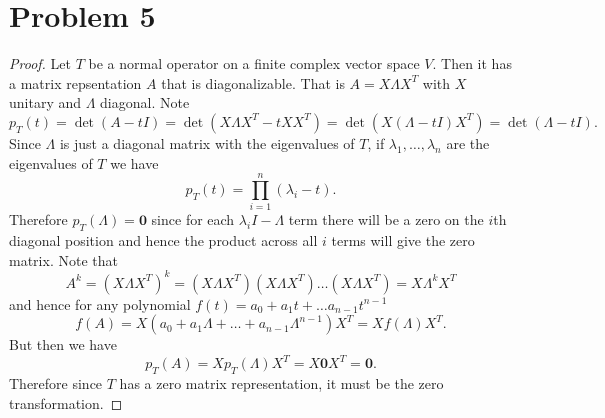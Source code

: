 \documentclass{article}
\begin{document}
\section*{Problem 5}
\begin{proof}
    Let $T$ be a normal operator on a finite complex vector space $V$. Then it has a matrix repsentation $A$ that is diagonalizable. That is $A = X \Lambda X^T$ with $X$ unitary and $\Lambda$ diagonal. Note
    \[
        p_{T}(t) = \det(A - tI) = \det(X \Lambda X^T - t XX^T ) = \det(X (\Lambda - tI) X^T) = \det(\Lambda - tI)
    .\]
    Since $\Lambda$ is just a diagonal matrix with the eigenvalues of $T$, if $\lambda_1, \ldots, \lambda_n$ are the eigenvalues of $T$ we have
    \[
        p_{T}(t) = \prod_{i=1}^n (\lambda_i - t)
    .\]
    Therefore $p_T(\Lambda) = \mathbf{0}$ since for each $\lambda_i I - \Lambda$ term there will be a zero on the $i$th diagonal position and hence the product across all $i$ terms will give the zero matrix. Note that
    \[
        A^k = (X \Lambda X^T)^k = (X \Lambda X^T) (X \Lambda X^T) \ldots (X \Lambda X^T) = X \Lambda^k X^T
    \]
    and hence for any polynomial $f(t) = a_0 + a_1 t + \ldots a_{n-1} t^{n-1}$
    \[
        f(A) = X(a_0 + a_1 \Lambda + \ldots + a_{n-1} \Lambda^{n-1}) X^T = X f(\Lambda) X^T
    .\]
    But then we have
    \[
        p_T(A) = X p_T(\Lambda) X^T = X \mathbf{0} X^T = \mathbf{0}
    .\]
    Therefore since $T$ has a zero matrix representation, it must be the zero transformation.
\end{proof}
\end{document}
